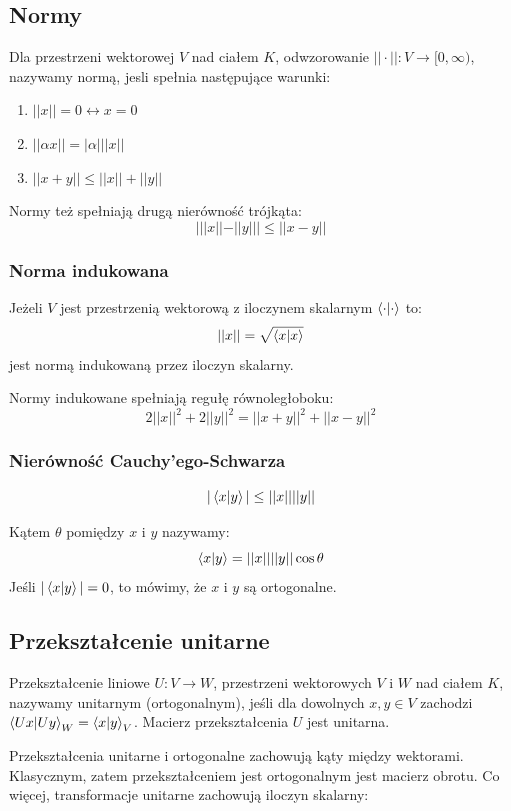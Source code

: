 \documentclass{../notatki}
\begin{document}
\subsection{Normy}

Dla przestrzeni wektorowej $V$ nad ciałem $K$,
odwzorowanie $||\cdot||: V \to [0, \infty)$, nazywamy normą, jesli spełnia
następujące warunki:
\begin{enumerate}
  \item $||x|| = 0 \leftrightarrow x = 0$
  \item $||\alpha x || = |\alpha | ||x||$
  \item $||x + y|| \leq ||x|| + ||y||$
\end{enumerate}
Normy też spełniają drugą nierówność trójkąta:
$$
| ||x|| - ||y|| | \leq ||x - y||
$$

\subsubsection{Norma indukowana}

Jeżeli $V$ jest przestrzenią wektorową z iloczynem skalarnym
$\braket{\cdot}{\cdot}$ to:
$$
||x|| = \sqrt{\braket{x}{x}}
$$
jest normą indukowaną przez iloczyn skalarny.

Normy indukowane spełniają regułę równoległoboku:
$$
2 ||x||^2 + 2||y||^2 = ||x + y||^2 + ||x - y||^2
$$

\subsubsection{Nierówność Cauchy'ego-Schwarza}

$$
|\braket{x}{y}| \leq ||x|| ||y||
$$

Kątem $\theta$ pomiędzy $x$ i $y$ nazywamy:
$$
\braket{x}{y} = ||x|| ||y|| \cos \theta
$$
Jeśli $|\braket{x}{y}| = 0$, to mówimy, że $x$ i $y$ są ortogonalne.

\subsection{Przekształcenie unitarne}

Przekształcenie liniowe $U: V \to W$, przestrzeni wektorowych $V$ i $W$ nad
ciałem $K$, nazywamy unitarnym (ortogonalnym), jeśli dla dowolnych $x, y \in V$
zachodzi $\braket{Ux}{Uy}_W = \braket{x}{y}_V$. Macierz przekształcenia $U$
jest unitarna.

Przekształcenia unitarne i ortogonalne zachowują kąty między wektorami.
Klasycznym, zatem przekształceniem jest ortogonalnym jest macierz obrotu.
Co więcej, transformacje unitarne zachowują iloczyn skalarny:
$$
$$
\end{document}
